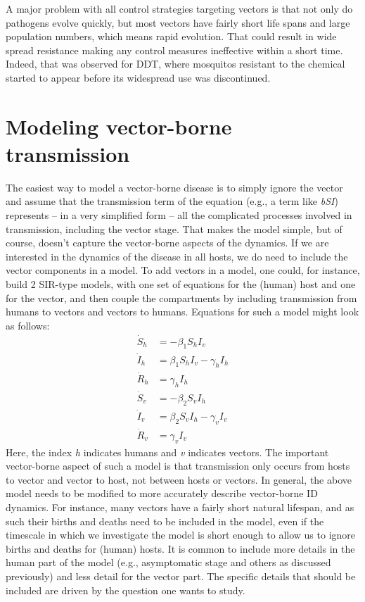 \documentclass[]{book}
\theoremstyle{definition}
\theoremstyle{definition}
\theoremstyle{definition}
\theoremstyle{remark}
\begin{document}
A major problem with all control strategies targeting vectors is that
not only do pathogens evolve quickly, but most vectors have fairly short
life spans and large population numbers, which means rapid evolution.
That could result in wide spread resistance making any control measures
ineffective within a short time. Indeed, that was observed for DDT,
where mosquitos resistant to the chemical started to appear before its
widespread use was discontinued.

\section{Modeling vector-borne transmission}\label{myadvancedbox}

The easiest way to model a vector-borne disease is to simply ignore the
vector and assume that the transmission term of the equation (e.g., a
term like \emph{bSI}) represents -- in a very simplified form -- all the
complicated processes involved in transmission, including the vector
stage. That makes the model simple, but of course, doesn't capture the
vector-borne aspects of the dynamics. If we are interested in the
dynamics of the disease in all hosts, we do need to include the vector
components in a model. To add vectors in a model, one could, for
instance, build 2 SIR-type models, with one set of equations for the
(human) host and one for the vector, and then couple the compartments by
including transmission from humans to vectors and vectors to humans.
Equations for such a model might look as follows: \[
\begin{aligned}
\dot S_h &= - \beta_1 S_h I_v \\
\dot I_h &= \beta_1S_h I_v - \gamma_h I_h \\
\dot R_h &= \gamma_h I_h \\
\dot S_v &= - \beta_2 S_v I_h \\
\dot I_v &= \beta_2 S_v I_h - \gamma_v I_v \\
\dot R_v &= \gamma_v I_v
\end{aligned}
\] Here, the index \emph{h} indicates humans and \emph{v} indicates
vectors. The important vector-borne aspect of such a model is that
transmission only occurs from hosts to vector and vector to host, not
between hosts or vectors. In general, the above model needs to be
modified to more accurately describe vector-borne ID dynamics. For
instance, many vectors have a fairly short natural lifespan, and as such
their births and deaths need to be included in the model, even if the
timescale in which we investigate the model is short enough to allow us
to ignore births and deaths for (human) hosts. It is common to include
more details in the human part of the model (e.g., asymptomatic stage
and others as discussed previously) and less detail for the vector part.
The specific details that should be included are driven by the question
one wants to study.
\end{document}
